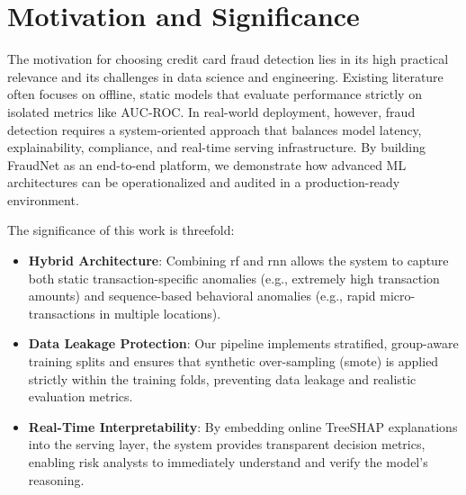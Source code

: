 \section{Motivation and Significance}

The motivation for choosing credit card fraud detection lies in its high practical relevance and its challenges in data science and engineering. Existing literature often focuses on offline, static models that evaluate performance strictly on isolated metrics like AUC-ROC. In real-world deployment, however, fraud detection requires a system-oriented approach that balances model latency, explainability, compliance, and real-time serving infrastructure. By building FraudNet as an end-to-end platform, we demonstrate how advanced ML architectures can be operationalized and audited in a production-ready environment.

The significance of this work is threefold:
\begin{itemize}
    \item \textbf{Hybrid Architecture}: Combining \gls{rf} and \gls{rnn} allows the system to capture both static transaction-specific anomalies (e.g., extremely high transaction amounts) and sequence-based behavioral anomalies (e.g., rapid micro-transactions in multiple locations).
    \item \textbf{Data Leakage Protection}: Our pipeline implements stratified, group-aware training splits and ensures that synthetic over-sampling (\gls{smote}) is applied strictly within the training folds, preventing data leakage and realistic evaluation metrics.
    \item \textbf{Real-Time Interpretability}: By embedding online TreeSHAP explanations into the serving layer, the system provides transparent decision metrics, enabling risk analysts to immediately understand and verify the model's reasoning.
\end{itemize}

